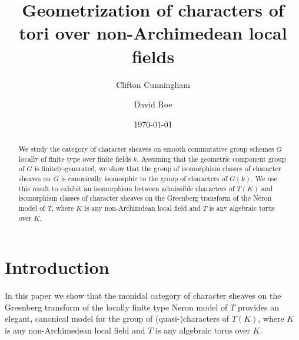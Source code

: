 \documentclass[11pt]{amsart}
\title[Geometration of characters of tori]{Geometrization of characters of tori over non-Archimedean local fields}
\date{\today}
\author{Clifton Cunningham}
\author{David Roe}
\theoremstyle{plain}
\theoremstyle{definition}
\theoremstyle{remark}
\newcommand{\Fq}{k}
\begin{document}
\begin{abstract}
  We study the category of character sheaves on smooth commutative
  group schemes $G$ locally of finite type over finite fields
  $\Fq$. Assuming that the geometric component group of $G$
  is finitely-generated, we show that the group of isomorphism classes
  of character sheaves on $G$ is canonically isomorphic to the group
  of characters of $G(\Fq)$. We use this result to exhibit an
  isomorphism between admissible characters of $T(K)$ and isomorphism
  classes of character sheaves on the Greenberg transform of the Néron
  model of $T$, where $K$ is any non-Archimdean local field and $T$ is
  any algebraic torus over $K$.
\end{abstract}

\maketitle

\section{Introduction}

%
In this paper we show that the monidal category of character sheaves
on the Greenberg transform of the locally finite type Neron model of
$T$ provides an elegant, canonical model for the group of
(quasi-)characters of $T(K)$, where $K$ is any non-Archimedean local
field and $T$ is any algebraic torus over $K$.
\end{document}
